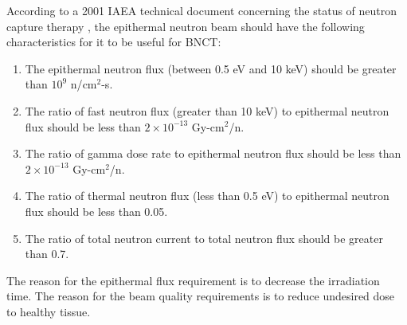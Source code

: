 According to a 2001 IAEA technical document concerning the status of neutron capture therapy \cite{iaea2001}, the epithermal neutron beam should have the following characteristics for it to be useful for BNCT:
\begin{enumerate}
\item The epithermal neutron flux (between 0.5 eV and 10 keV) should be greater than $10^9$ n/$\text{cm}^2$-s.
\item The ratio of fast neutron flux (greater than 10 keV) to epithermal neutron flux should be less than $2\times 10^{-13}$ Gy-$\text{cm}^2$/n.
\item The ratio of gamma dose rate to epithermal neutron flux should be less than $2\times 10^{-13}$ Gy-$\text{cm}^2$/n.
\item The ratio of thermal neutron flux (less than 0.5 eV) to epithermal neutron flux should be less than 0.05.
\item The ratio of total neutron current to total neutron flux should be greater than 0.7.
\end{enumerate}
The reason for the epithermal flux requirement is to decrease the irradiation time.
The reason for the beam quality requirements is to reduce undesired dose to healthy tissue.

